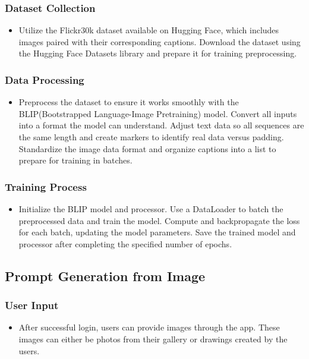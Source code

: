 \documentclass[conference]{IEEEtran}
\begin{document}
\subsubsection{Dataset Collection}
\begin{itemize}
    \item Utilize the Flickr30k dataset available on Hugging Face, which includes images paired with their corresponding captions. Download the dataset using the Hugging Face Datasets library and prepare it for training preprocessing.\\
\end{itemize}

\subsubsection{Data Processing}
\begin{itemize}
    \item Preprocess the dataset to ensure it works smoothly with the BLIP(Bootstrapped  Language-Image  Pretraining) model. Convert all inputs into a format the model can understand. Adjust text data so all sequences are the same length and create markers to identify real data versus padding. Standardize the image data format and organize captions into a list to prepare for training in batches.\\
\end{itemize}

\subsubsection{Training Process}
\begin{itemize}
    \item Initialize the BLIP model and processor. Use a DataLoader to batch the preprocessed data and train the model. Compute and backpropagate the loss for each batch, updating the model parameters. Save the trained model and processor after completing the specified number of epochs.\\
\end{itemize}

\subsection{Prompt Generation from Image}

\subsubsection{User Input}
\begin{itemize}
    \item After successful login, users can provide images through the app. These images can either be photos from their gallery or drawings created by the users.\\
\end{itemize}
\end{document}
